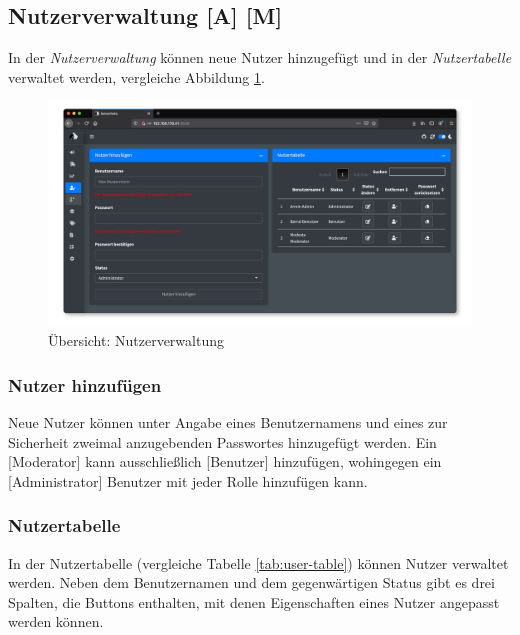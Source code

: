 \documentclass[
]{article}
\begin{document}
\hypertarget{user-management}{%
\subsection{Nutzerverwaltung {[}A{]} {[}M{]}}\label{user-management}}

In der \emph{Nutzerverwaltung} können neue Nutzer hinzugefügt und in der \emph{Nutzertabelle} verwaltet werden, vergleiche Abbildung \ref{fig:user-management-overview}.

\begin{figure}
\centering
\includegraphics{./img/user_management_overview.png}
\caption{\label{fig:user-management-overview}Übersicht: Nutzerverwaltung}
\end{figure}

\hypertarget{nutzer-hinzufuxfcgen}{%
\subsubsection{Nutzer hinzufügen}\label{nutzer-hinzufuxfcgen}}

Neue Nutzer können unter Angabe eines Benutzernamens und eines zur Sicherheit zweimal anzugebenden Passwortes hinzugefügt werden. Ein {[}Moderator{]} kann ausschließlich {[}Benutzer{]} hinzufügen, wohingegen ein {[}Administrator{]} Benutzer mit jeder Rolle hinzufügen kann.

\hypertarget{nutzertabelle}{%
\subsubsection{Nutzertabelle}\label{nutzertabelle}}

In der Nutzertabelle (vergleiche Tabelle \ref{tab:user-table}) können Nutzer verwaltet werden. Neben dem Benutzernamen und dem gegenwärtigen Status gibt es drei Spalten, die Buttons enthalten, mit denen Eigenschaften eines Nutzer angepasst werden können.
\end{document}
